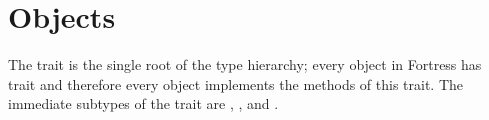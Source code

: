 %
%
%
%

\chapter{Objects}



The trait  is the single root of the type hierarchy; every
object in Fortress has trait  and therefore every object
implements the methods of this trait.  The immediate subtypes of the trait
 are , , and \TYP{()}.

